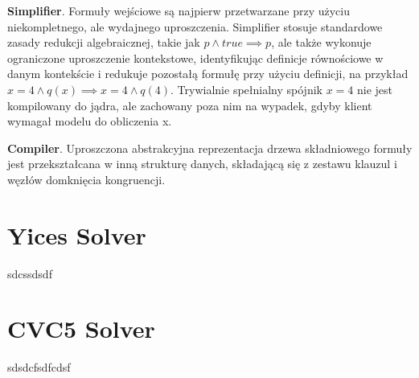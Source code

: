 \textbf{Simplifier}. Formuły wejściowe są najpierw przetwarzane przy użyciu niekompletnego, ale wydajnego uproszczenia. Simplifier stosuje standardowe zasady redukcji algebraicznej, takie jak $p \land true \implies p$, ale także wykonuje ograniczone uproszczenie kontekstowe, identyfikując definicje równościowe w danym kontekście i redukuje pozostałą formułę przy użyciu definicji, na przykład $x = 4 \land q(x) \implies x = 4 \land q(4)$. Trywialnie spełnialny spójnik $x = 4$ nie jest kompilowany do jądra, ale zachowany poza nim na wypadek, gdyby klient wymagał modelu do obliczenia x.

\textbf{Compiler}. Uproszczona abstrakcyjna reprezentacja drzewa składniowego formuły jest przekształcana w inną strukturę danych, składającą się z zestawu klauzul i węzłów domknięcia kongruencji.


\section{Yices Solver}
sdcssdsdf

\section{CVC5 Solver}
sdsdcfsdfcdsf
